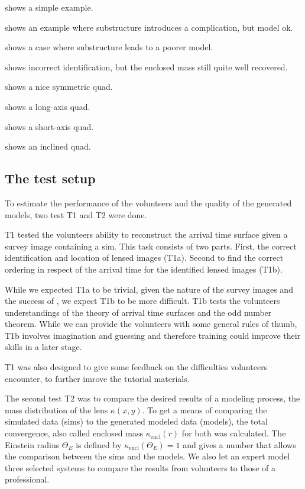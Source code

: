  shows a simple example.

 shows an example where substructure introduces a
complication, but model ok.

 shows a case where substructure leads to a
poorer model.

 shows incorrect identification, but the enclosed
mass still quite well recovered.

 shows a nice symmetric quad.

 shows a long-axis quad.

 shows a short-axis quad.

 shows an inclined quad.


\subsection{The test setup} \label{sec:testsetup}

To estimate the performance of the volunteers and the quality of the generated models, two test T1 and T2 were done.

T1 tested the volunteers ability to reconstruct the arrival time surface given a survey image containing a sim.
This task consists of two parts.
First, the correct identification and location of lensed images (T1a).
Second to find the correct ordering in respect of the arrival time for the identified lensed images (T1b).

While we expected T1a to be trivial, given the nature of the survey images and the success of \sw, we expect T1b to be more difficult.
T1b tests the volunteers understandings of the theory of arrival time surfaces and the odd number theorem.
While we can provide the volunteers with some general rules of thumb, T1b involves imagination and guessing and therefore training could improve their skills in a later stage.

T1 was also designed to give some feedback on the difficulties volunteers encounter, to further imrove the tutorial materials.

The second test T2 was to compare the desired results of a modeling process, the mass distribution of the lens $\kappa(x, y)$.
To get a means of comparing the simulated data (sims) to the generated modeled data (models), the total convergence, also called enclosed mass $\kappa_{\text{encl}}(r)$ for both was calculated.
The Einstein radius $\Theta_E$ is defined by $\kappa_{\text{encl}}(\Theta_E)=1$ and gives a number that allows the comparison between the sims and the models.
We also let an expert model three selected systems to compare the results from volunteers to those of a professional.


